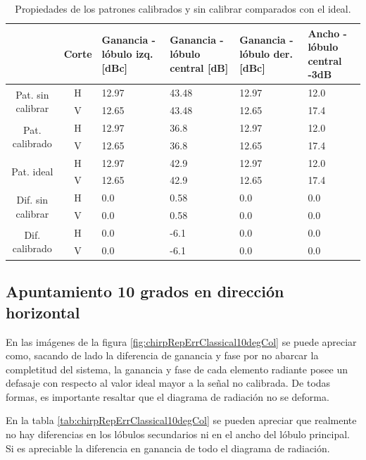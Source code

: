\begin{table}[H]
  \footnotesize
  \centering
  \begin{tabular}{|c|c|p{2cm}|p{2.5cm}|p{2.5cm}|p{2.5cm}|}
    \cline{2-6}
    \multicolumn{1}{c|}{} & Corte & Ganancia - lóbulo izq. [dBc] & Ganancia - lóbulo central [dB] &
    Ganancia - lóbulo der. [dBc] & Ancho - lóbulo central -3dB \tabularnewline\hline
    \multirow{2}{2cm}{Pat. sin calibrar} & H & 12.97 & 43.48 & 12.97 & 12.0 \tabularnewline\cline{2-6}
     & V & 12.65 & 43.48 & 12.65 & 17.4 \tabularnewline\hline
    \multirow{2}{2cm}{Pat. calibrado} & H & 12.97 & 36.8 & 12.97 & 12.0 \tabularnewline\cline{2-6}
     & V & 12.65 & 36.8 & 12.65 & 17.4 \tabularnewline\hline
    \multirow{2}{2cm}{Pat. ideal} & H & 12.97 & 42.9 & 12.97 & 12.0 \tabularnewline\cline{2-6}
     & V & 12.65 & 42.9 & 12.65 & 17.4 \tabularnewline\hline
    \multirow{2}{2cm}{Dif. sin calibrar} & H & 0.0 & 0.58 & 0.0 & 0.0\tabularnewline\cline{2-6}
     & V & 0.0 & 0.58 & 0.0 & 0.0 \tabularnewline\hline
    \multirow{2}{2cm}{Dif. calibrado} & H & 0.0 & -6.1 & 0.0 & 0.0 \tabularnewline\cline{2-6}
     & V & 0.0 & -6.1 & 0.0 & 0.0 \tabularnewline\hline
  \end{tabular}
  \caption{Propiedades de los patrones calibrados y sin calibrar comparados con el ideal.}
  \label{tab:chirpRepErrClassical0deg}
\end{table}


\subsection{Apuntamiento 10 grados en dirección horizontal}

En las imágenes de la figura \ref{fig:chirpRepErrClassical10degCol} se puede apreciar como, sacando de lado la diferencia de 
ganancia y fase por no abarcar la completitud del sistema, la ganancia y fase de cada elemento radiante posee un defasaje con 
respecto al valor ideal mayor a la señal no calibrada. De todas formas, es importante resaltar que el diagrama de radiación no 
se deforma. 

En la tabla \ref{tab:chirpRepErrClassical10degCol} se pueden apreciar que realmente no hay diferencias en los lóbulos secundarios 
ni en el ancho del lóbulo principal. Si es apreciable la diferencia en ganancia de todo el diagrama de radiación.

